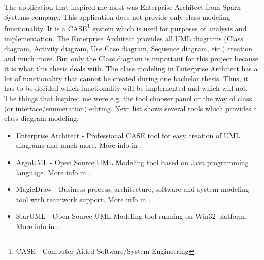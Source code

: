 The application that inspired me most was Enterprise Architect from Sparx Systems \cite{sparxsystemsweb} company. This application does not provide only class modeling functionality. It is a CASE\footnote{CASE - Computer Aided Software/System Engineering} system which is used for purposes of analysis and implementation. The Enterprise Architect provides all UML diagrams (Class diagram, Activity diagram, Use Case diagram, Sequence diagram, etc.) creation and much more. But only the Class diagram is important for this project because it is what this thesis deals with. The class modeling in Enterprise Architect has a lot of functionality that cannot be created during one bachelor thesis. Thus, it has to be decided which functionality will be implemented and which will not. The things that inspired me were e.g. the tool chooser panel or the way of class (or interface/enumeration) editing. Next list shows several tools which provides a class diagram modeling.

\begin{itemize}
    \item Enterprise Architect - Professional CASE tool for easy creation of UML diagrams and much more. More info in \cite{sparxsystemsweb}.
    \item ArgoUML - Open Source UML Modeling tool based on Java programming language. More info in \cite{ArgoUMLWeb}.
    \item MagicDraw - Business process, architecture, software and system modeling tool with teamwork support. More info in \cite{MagicDrawWeb}.
    \item StarUML - Open Source UML Modeling tool running on Win32 platform. More info in \cite{StarUMLWeb}.
\end{itemize}
